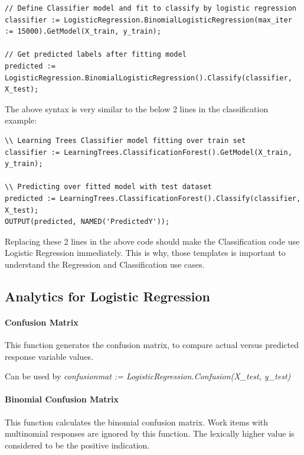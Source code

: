 \begin{lstlisting}
// Define Classifier model and fit to classify by logistic regression
classifier := LogisticRegression.BinomialLogisticRegression(max_iter := 15000).GetModel(X_train, y_train);

// Get predicted labels after fitting model
predicted := LogisticRegression.BinomialLogisticRegression().Classify(classifier, X_test);
\end{lstlisting}

The above syntax is very similar to the below 2 lines in the classification example:

\begin{lstlisting}
\\ Learning Trees Classifier model fitting over train set
classifier := LearningTrees.ClassificationForest().GetModel(X_train, y_train);

\\ Predicting over fitted model with test dataset
predicted := LearningTrees.ClassificationForest().Classify(classifier, X_test);
OUTPUT(predicted, NAMED('PredictedY'));
\end{lstlisting}

Replacing these 2 lines in the above code should make the Classification code use Logistic Regression immediately. This is why, those templates is important to understand the Regression and Classification use cases.

\subsection{Analytics for Logistic Regression}

\paragraph{Confusion Matrix}

This function generates the confusion matrix, to compare actual versus predicted response variable values.

Can be used by \textit{confusionmat := LogisticRegression.Confusion(X\_test, y\_test)}

\paragraph{Binomial Confusion Matrix}

This function calculates the binomial confusion matrix. Work items with multinomial responses are ignored by this function. The lexically higher value is considered to be the positive indication.


